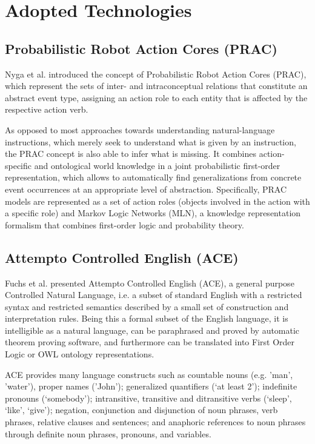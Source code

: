 \documentclass[oribibl]{llncs}
\begin{document}
\section{Adopted Technologies}
\subsection{Probabilistic Robot Action Cores (PRAC)}
Nyga et al.\cite{nyga12actioncore} introduced the concept of Probabilistic Robot Action Cores (PRAC), which represent
the sets of inter- and intraconceptual relations that constitute an abstract
event type, assigning an action role to each entity that is affected by the respective action verb. 

As opposed to most approaches towards understanding natural-language instructions, which merely seek to understand what is given by an instruction, the PRAC concept is also able to infer what is missing. It combines action-specific and ontological world knowledge in a joint probabilistic first-order representation, which allows to automatically find generalizations from concrete event occurrences at an appropriate level of abstraction. 
Specifically, PRAC models are represented as a set of action roles (objects involved in the action with a specific role) and Markov Logic Networks (MLN), a knowledge representation formalism that combines first-order logic and probability theory\cite{DBLP:journals/ml/RichardsonD06}.

\subsection{Attempto Controlled English (ACE)}
Fuchs et al.\cite{fuchs:flairs2006} presented Attempto Controlled English (ACE), a general purpose Controlled Natural Language, i.e. a subset of standard English with a restricted syntax and restricted semantics described by a small set of construction and interpretation rules.
Being this a formal subset of the English language, it is intelligible as a natural language, can be paraphrased and proved by automatic theorem proving software, and furthermore can be translated into First Order Logic or OWL ontology representations.

ACE provides many language constructs such as countable nouns (e.g. 'man', 'water'), proper names ('John'); 
generalized quantifiers (‘at least 2’); indefinite pronouns (‘somebody’); intransitive, transitive and ditransitive verbs (‘sleep’, ‘like’, ‘give’); negation, conjunction and disjunction of noun phrases, verb phrases, relative clauses and sentences; and anaphoric references to noun phrases through definite noun phrases, pronouns, and variables.
\end{document}
